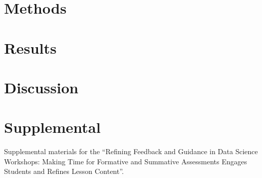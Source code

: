 \documentclass[../main.tex]{subfiles}
\begin{document}
\section{Methods}

    

\section{Results}

    

\section{Discussion}

    

\section{Supplemental}

    Supplemental materials for the
    ``Refining Feedback and Guidance in Data Science Workshops:
    Making Time for Formative and Summative Assessments Engages Students and Refines Lesson Content''.

    
\end{document}
